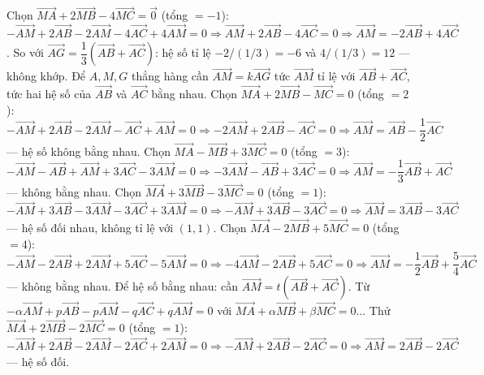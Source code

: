 \begin{bt}
{Chọn $\overrightarrow{MA}+2\overrightarrow{MB}-4\overrightarrow{MC}=\overrightarrow{0}$ (tổng $=-1$): $-\overrightarrow{AM}+2\overrightarrow{AB}-2\overrightarrow{AM}-4\overrightarrow{AC}+4\overrightarrow{AM}=0\Rightarrow \overrightarrow{AM}+2\overrightarrow{AB}-4\overrightarrow{AC}=0\Rightarrow\overrightarrow{AM}=-2\overrightarrow{AB}+4\overrightarrow{AC}$. So với $\overrightarrow{AG}=\dfrac13(\overrightarrow{AB}+\overrightarrow{AC})$: hệ số tỉ lệ $-2/(1/3)=-6$ và $4/(1/3)=12$ — không khớp.
Để $A,M,G$ thẳng hàng cần $\overrightarrow{AM}=k\overrightarrow{AG}$ tức $\overrightarrow{AM}$ tỉ lệ với $\overrightarrow{AB}+\overrightarrow{AC}$, tức hai hệ số của $\overrightarrow{AB}$ và $\overrightarrow{AC}$ bằng nhau. 
Chọn $\overrightarrow{MA}+2\overrightarrow{MB}-\overrightarrow{MC}=0$ (tổng $=2$): $-\overrightarrow{AM}+2\overrightarrow{AB}-2\overrightarrow{AM}-\overrightarrow{AC}+\overrightarrow{AM}=0\Rightarrow -2\overrightarrow{AM}+2\overrightarrow{AB}-\overrightarrow{AC}=0\Rightarrow\overrightarrow{AM}=\overrightarrow{AB}-\dfrac12\overrightarrow{AC}$ — hệ số không bằng nhau.
Chọn $\overrightarrow{MA}-\overrightarrow{MB}+3\overrightarrow{MC}=0$ (tổng $=3$): $-\overrightarrow{AM}-\overrightarrow{AB}+\overrightarrow{AM}+3\overrightarrow{AC}-3\overrightarrow{AM}=0\Rightarrow -3\overrightarrow{AM}-\overrightarrow{AB}+3\overrightarrow{AC}=0\Rightarrow\overrightarrow{AM}=-\dfrac13\overrightarrow{AB}+\overrightarrow{AC}$ — không bằng nhau.
Chọn $\overrightarrow{MA}+3\overrightarrow{MB}-3\overrightarrow{MC}=0$ (tổng $=1$): $-\overrightarrow{AM}+3\overrightarrow{AB}-3\overrightarrow{AM}-3\overrightarrow{AC}+3\overrightarrow{AM}=0\Rightarrow -\overrightarrow{AM}+3\overrightarrow{AB}-3\overrightarrow{AC}=0\Rightarrow\overrightarrow{AM}=3\overrightarrow{AB}-3\overrightarrow{AC}$ — hệ số đối nhau, không tỉ lệ với $(1{,}1)$.
Chọn $\overrightarrow{MA}-2\overrightarrow{MB}+5\overrightarrow{MC}=0$ (tổng $=4$): $-\overrightarrow{AM}-2\overrightarrow{AB}+2\overrightarrow{AM}+5\overrightarrow{AC}-5\overrightarrow{AM}=0\Rightarrow -4\overrightarrow{AM}-2\overrightarrow{AB}+5\overrightarrow{AC}=0\Rightarrow\overrightarrow{AM}=-\dfrac12\overrightarrow{AB}+\dfrac54\overrightarrow{AC}$ — không bằng nhau.
Để hệ số bằng nhau: cần $\overrightarrow{AM}=t(\overrightarrow{AB}+\overrightarrow{AC})$. Từ $-\alpha\overrightarrow{AM}+p\overrightarrow{AB}-p\overrightarrow{AM}-q\overrightarrow{AC}+q\overrightarrow{AM}=0$ với $\overrightarrow{MA}+\alpha\overrightarrow{MB}+\beta\overrightarrow{MC}=0$... 
Thử $\overrightarrow{MA}+2\overrightarrow{MB}-2\overrightarrow{MC}=0$ (tổng $=1$): $-\overrightarrow{AM}+2\overrightarrow{AB}-2\overrightarrow{AM}-2\overrightarrow{AC}+2\overrightarrow{AM}=0\Rightarrow-\overrightarrow{AM}+2\overrightarrow{AB}-2\overrightarrow{AC}=0\Rightarrow\overrightarrow{AM}=2\overrightarrow{AB}-2\overrightarrow{AC}$ — hệ số đối.
}
\end{bt}
